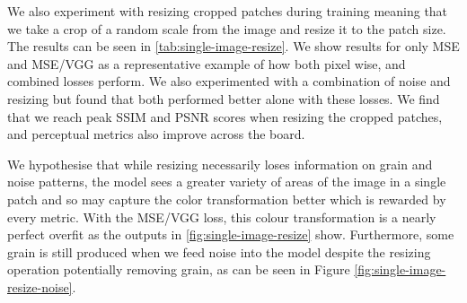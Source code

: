 We also experiment with resizing cropped patches during training meaning that we take a crop of a random scale from the image and resize it to the patch size. The results can be seen in \ref{tab:single-image-resize}. We show results for only MSE and MSE/VGG as a representative example of how both pixel wise, and combined losses perform. We also experimented with a combination of noise and resizing but found that both performed better alone with these losses.  We find that we reach peak SSIM and PSNR scores when resizing the cropped patches, and perceptual metrics also improve across the board.

We hypothesise that while resizing necessarily loses information on grain and noise patterns, the model sees a greater variety of areas of the image in a single patch and so may capture the color transformation better which is rewarded by every metric. With the MSE/VGG loss, this colour transformation is a nearly perfect overfit as the outputs in \ref{fig:single-image-resize} show. Furthermore, some grain is still produced when we feed noise into the model despite the resizing operation potentially removing grain, as can be seen in Figure \ref{fig:single-image-resize-noise}.


